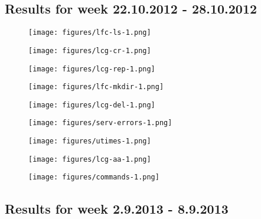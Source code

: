 \documentclass[a4paper, 11pt]{article} %
\begin{document}
\subsection{Results for week 22.10.2012 - 28.10.2012}

\begin{figure}[H]
  \centering
    \texttt{[image: figures/lfc-ls-1.png]}
\end{figure}
\begin{figure}[H]
  \centering
    \texttt{[image: figures/lcg-cr-1.png]}
\end{figure}
\begin{figure}[H]
  \centering
    \texttt{[image: figures/lcg-rep-1.png]}
\end{figure}
\begin{figure}[H]
  \centering
    \texttt{[image: figures/lfc-mkdir-1.png]}
\end{figure}
\begin{figure}[H]
  \centering
    \texttt{[image: figures/lcg-del-1.png]}
\end{figure}
\begin{figure}[H]
  \centering
    \texttt{[image: figures/serv-errors-1.png]}
\end{figure}
\begin{figure}[H]
  \centering
    \texttt{[image: figures/utimes-1.png]}
\end{figure}
\begin{figure}[H]
  \centering
    \texttt{[image: figures/lcg-aa-1.png]}
\end{figure}

\begin{figure}[H]
  \centering
    \texttt{[image: figures/commands-1.png]}
\end{figure}

\subsection{Results for week 2.9.2013 - 8.9.2013}
\end{document}
